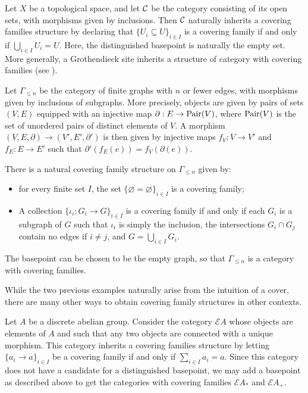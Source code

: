 \begin{example}
    Let $X$ be a topological space, and let $\mathcal{C}$ be the category consisting of its open sets, with morphisms given by inclusions. Then $\mathcal{C}$ naturally inherits a covering families structure by declaring that $\{U_i \subseteq U\}_{i \in I}$ is a covering family if and only if $\bigcup_{i \in I} U_i = U$. Here, the distinguished basepoint is naturally the empty set. More generally, a Grothendieck site inherits a structure of category with covering families (see \cite[Chapter~2, Definition~1.1.5]{grothendieck1963topos}).
\end{example}

\begin{example}
    Let $\Gamma_{\leq n}$ be the category of finite graphs with $n$ or fewer edges, with morphisms given by inclusions of subgraphs. More precisely, objects are given by pairs of sets $(V,E)$ equipped with an injective map $\partial: E \to \textnormal{Pair}(V)$, where $\textnormal{Pair}(V)$ is the set of unordered pairs of distinct elements of $V$. A morphism $(V,E, \partial) \to (V',E', \partial')$ is then given by injective maps $f_V : V \to V'$ and $f_E : E \to E'$ such that $\partial'(f_E(e)) = f_V(\partial(e))$.

    There is a natural covering family structure on $\Gamma_{\leq n}$ given by:
    \begin{itemize}
        \item for every finite set $I$, the set $\{\varnothing = \varnothing\}_{i\in I}$ is a covering family;
        \item A collection $\{\iota_i : G_i \to G\}_{i \in I}$ is a covering family if and only if each $G_i$ is a subgraph of $G$ such that $\iota_i$ is simply the inclusion, the intersections $G_i \cap G_j$ contain no edges if $i\neq j$, and $G = \bigcup_{i \in I} G_i$.
    \end{itemize}
    The basepoint can be chosen to be the empty graph, so that $\Gamma_{\leq n}$ is a category with covering families.
\end{example}

While the two previous examples naturally arise from the intuition of a cover, there are many other ways to obtain covering family structures in other contexts.

\begin{example}\label{example:EA}
    Let $A$ be a discrete abelian group. Consider the category $\mathcal{E} A$ whose objects are elements of $A$ and such that any two objects are connected with a unique morphism. This category inherits a covering families structure by letting $\{a_i \to a\}_{i \in I}$ be a covering family if and only if $\sum_{i \in I} a_i = a$. Since this category does not have a candidate for a distinguished basepoint, we may add a basepoint as described above to get the categories with covering families $\mathcal{E} A_*$ and $\mathcal{E} A_+$.
\end{example}

